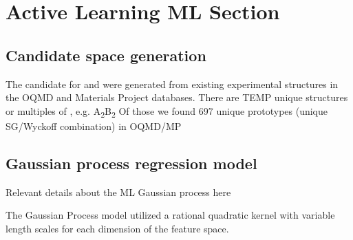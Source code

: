 

\section{Active Learning ML Section}  %
%

\subsection{Candidate space generation}
%
The candidate for \IrOtwo and \IrOthree were generated from existing experimental structures in the OQMD and Materials Project databases.
There are TEMP unique \ABtwo structures or multiples of \ABtwo,
e.g. A\textsubscript{2}B\textsubscript{2}
%
Of those we found 697 unique \ABtwo prototypes (unique SG/Wyckoff combination) in OQMD/MP


\subsection{Gaussian process regression model}
Relevant details about the ML Gaussian process here  %

The Gaussian Process model utilized a rational quadratic kernel with variable length scales for each dimension of the feature space.

